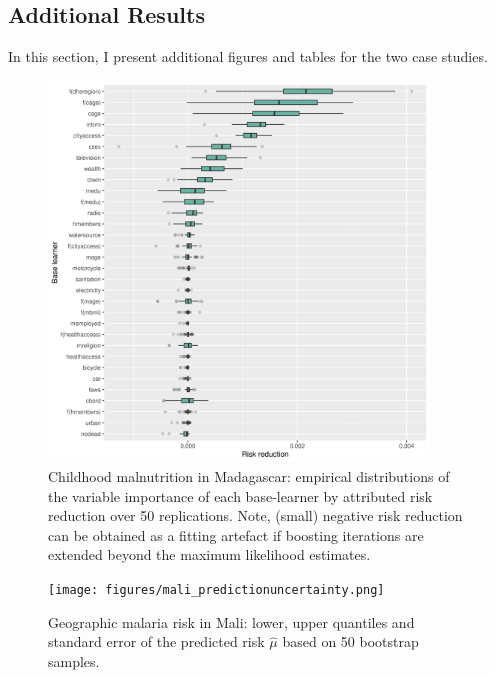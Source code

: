 \subsection{Additional Results}\label{sec:additional-results}

In this section, I present additional figures and tables for the two case studies.



\begin{figure}[!p ]
	\centering
	\includegraphics[width=0.9\textwidth, keepaspectratio]{figures/madagascar_variableimportance.png}
	\caption{Childhood malnutrition in Madagascar: empirical distributions of the variable importance of each base-learner by attributed risk reduction over 50 replications. Note, (small) negative risk reduction can be obtained as a fitting artefact if boosting iterations are extended beyond the maximum likelihood estimates.}
	\label{fig:madagascar_variableimportance}
\end{figure}

\begin{figure}[!p]
	\centering
	\texttt{[image: figures/mali\_predictionuncertainty.png]}
	\caption{Geographic malaria risk in Mali: lower, upper quantiles and standard error of the predicted risk $\hat{\mu}$ based on 50 bootstrap samples.}
	\label{fig:mali_predictionuncertainty}
\end{figure}
